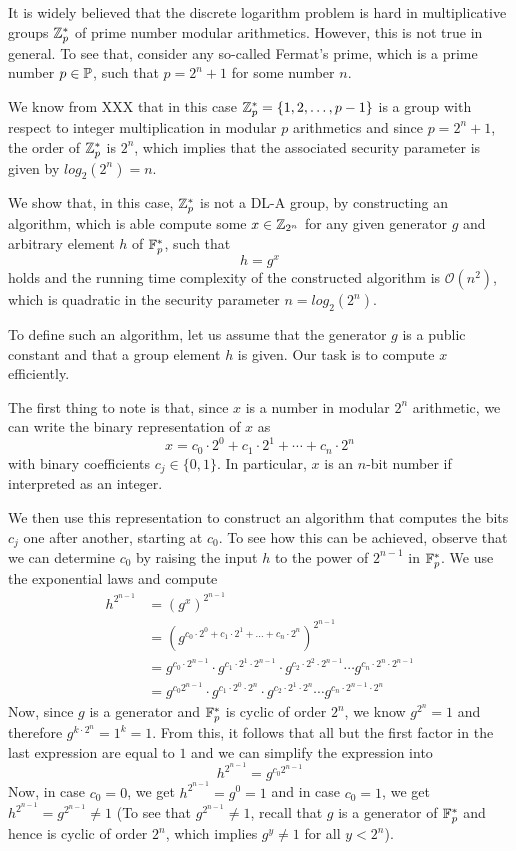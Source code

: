\begin{example} It is widely believed that the discrete logarithm problem is hard in multiplicative groups $\mathbb{Z}_p^*$ of prime number modular arithmetics. However, this is not true in general. To see that, consider any so-called Fermat's prime, which is a prime number $p\in\mathbb{P}$, such that $p=2^n+1$ for some number $n$.

We know from XXX that in this case $\mathbb{Z}_p^* = \{1,2,\ldots, p-1\}$ is a group with respect to integer multiplication in modular $p$ arithmetics and since $p=2^n+1$, the order of $\mathbb{Z}_p^*$ is $2^n$, which implies that the associated security parameter is given by $log_2(2^n)=n$.

We show that, in this case, $\mathbb{Z}_p^*$ is not a DL-A group, by constructing an algorithm, which is able compute some $x\in\mathbb{Z}_{2^n}$ for any given generator $g$ and arbitrary element $h$ of $\mathbb{F}_p^*$, such that
$$
h = g^x
$$
holds and the running time complexity of the constructed algorithm is $\mathcal{O}(n^2)$, which is quadratic in the security parameter $n=log_2(2^n)$.  

To define such an algorithm, let us assume that the generator $g$ is a public constant and that a group element $h$ is given. Our task is to compute $x$ efficiently. 

The first thing to note is that, since $x$ is a number in modular $2^n$ arithmetic, we can write the binary representation of $x$ as
$$
x = c_0\cdot 2^0 + c_1\cdot 2^1 + \cdots + c_n \cdot 2^n
$$
with binary coefficients $c_j\in\{0,1\}$. In particular, $x$ is an $n$-bit number if interpreted as an integer.

We then use this representation to construct an algorithm that computes the bits $c_j$ one after another, starting at $c_0$. To see how this can be achieved, observe that we can determine $c_0$ by raising the input $h$ to the power of $2^{n-1}$ in $\mathbb{F}_p^*$. We use the exponential laws and compute 
\begin{align*}
h^{2^{n-1}} & = \left(g^x\right)^{2^{n-1}}\\
            & = \left(g^{c_0\cdot 2^0 + c_1\cdot 2^1 + \ldots + c_n\cdot 2^n}\right)^{2^{n-1}}\\
            & = g^{c_0\cdot 2^{n-1}}\cdot g^{c_1\cdot 2^1\cdot 2^{n-1}} \cdot 
            g^{c_2\cdot 2^2\cdot 2^{n-1}} \cdots g^{c_n\cdot 2^n\cdot 2^{n-1}}\\
            & = g^{c_0 2^{n-1}}\cdot g^{c_1\cdot 2^0\cdot 2^{n}} \cdot
            g^{c_2\cdot 2^1\cdot 2^{n}} \cdots g^{c_n\cdot 2^{n-1}\cdot 2^{n}}
\end{align*}
Now, since $g$ is a generator and $\mathbb{F}_p^*$ is cyclic of order $2^n$, we know $g^{2^n}=1$ and therefore $g^{k\cdot 2^n}= 1^k=1$. From this, it follows that all but the first factor in the last expression are equal to $1$ and we can simplify the expression into
$$
h^{2^{n-1}} = g^{c_0 2^{n-1}}
$$ 
Now, in case $c_0=0$, we get $h^{2^{n-1}} = g^0=1$ and in case $c_0=1$, we get 
$h^{2^{n-1}} = g^{2^{n-1}}\neq 1$ (To see that $g^{2^{n-1}}\neq 1$, recall that $g$ is a generator of $\mathbb{F}_p^*$ and hence is cyclic of order $2^n$, which implies $g^y\neq 1$ for all $y<2^n$).


\end{example}
